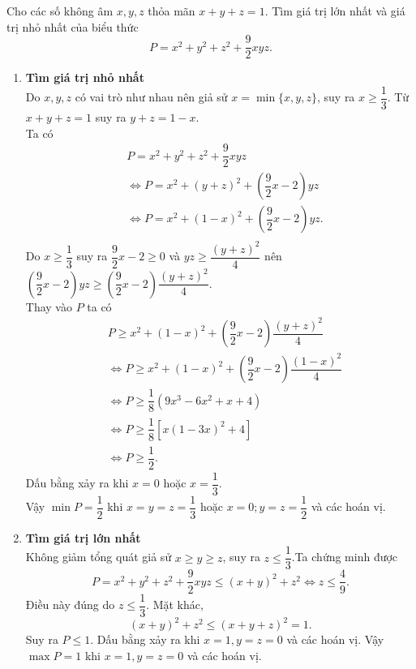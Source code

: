 \begin{ex}%
Cho các số không âm $x, y, z$ thỏa mãn $x+y+z=1$. Tìm giá trị lớn nhất và giá trị nhỏ nhất của biểu thức \[P=x^2+y^2+z^2+\dfrac{9}{2}xyz.\]
\loigiai
{
\begin{enumerate}
\item {\bf Tìm giá trị nhỏ nhất}\\
Do $x, y, z$ có vai trò như nhau nên giả sử $x =\min\{x, y, z\}$, suy ra $x \ge \dfrac{1}{3}$. Từ $x+y+z=1$ suy ra $y+z=1-x$.\\
Ta có 
\[
\begin{aligned}
& P =x^2+y^2+z^2+\dfrac{9}{2}xyz\\ 
& \Leftrightarrow P=x^2+(y+z)^2+\left( \dfrac{9}{2}x -2\right)yz\\
&\Leftrightarrow P=x^2+(1-x)^2+\left( \dfrac{9}{2}x -2\right)yz.\\
\end{aligned}
\]
Do $x \ge \dfrac{1}{3}$ suy ra $\dfrac{9}{2}x -2 \ge 0$ và $yz \ge \dfrac{(y+z)^2}{4}$ nên $\left( \dfrac{9}{2}x -2\right)yz \ge \left( \dfrac{9}{2}x -2\right)\dfrac{(y+z)^2}{4}$. \\
Thay vào $P$ ta có
\[
\begin{aligned}
&P \ge x^2+(1-x)^2+\left( \dfrac{9}{2}x -2\right)\dfrac{(y+z)^2}{4}\\ 
&\Leftrightarrow P \ge x^2+(1-x)^2+\left( \dfrac{9}{2}x -2\right)\dfrac{(1-x)^2}{4}\\
&\Leftrightarrow P \ge \dfrac{1}{8} (9x^3-6x^2+x+4)\\
&\Leftrightarrow P \ge \dfrac{1}{8}\left[ x(1-3x)^2 +4 \right]\\
& \Leftrightarrow P \ge \dfrac{1}{2}.
\end{aligned}
\]
Dấu bằng xảy ra khi $x=0$ hoặc $x=\dfrac{1}{3}$.\\
Vậy $\min P =\dfrac{1}{2}$ khi $x=y=z=\dfrac{1}{3}$ hoặc $x=0; y=z=\dfrac{1}{2}$ và các hoán vị.
\item {\bf Tìm giá trị lớn nhất}\\
Không giảm tổng quát giả sử $x \ge y \ge z$, suy  ra $z \le \dfrac{1}{3}$.Ta chứng minh được 
\[P=x^2+y^2+z^2+\dfrac{9}{2}xyz \le (x+y)^2+z^2 \Leftrightarrow z \le \dfrac{4}{9}.\]
Điều này đúng do $z \le \dfrac{1}{3}$. Mặt khác, 
\[(x+y)^2+z^2  \le (x+y+z)^2=1.\]
Suy ra $P \le 1$. Dấu bằng xảy ra khi $x=1, y=z=0$ và các hoán vị. Vậy $\max P=1$ khi $x=1, y=z=0$ và các hoán vị.
\end{enumerate}
    }
\end{ex}



